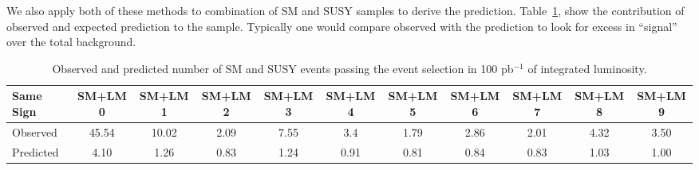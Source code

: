 We also apply both of these methods to combination of SM and SUSY samples to derive the
prediction. Table~\ref{tab:yieldsSUSY}, show the contribution of observed and expected prediction to 
the sample. Typically one would compare observed with the prediction to look for excess 
in ``signal'' over the total background.
\begin{table}[hbt]
\begin{center}
\small\addtolength{\tabcolsep}{-5pt}
\begin{tabular}{|l|c|c|c|c|c|c|c|c|c|c|}\hline
Same Sign  & SM+LM0 & SM+LM1 & SM+LM2 & SM+LM3 & SM+LM4 & SM+LM5 & SM+LM6 & SM+LM7 & SM+LM8 & SM+LM9 \\ \hline
Observed & 45.54 & 10.02 & 2.09 & 7.55 & 3.4 &	1.79 &	2.86 &	2.01 &	4.32 &	3.50 \\ \hline
Predicted & 4.10 & 1.26 & 0.83 & 1.24 &	0.91 &	0.81 &	0.84 &	0.83 &	1.03 &	1.00 \\ \hline
\end{tabular}
\caption{Observed and predicted  number of SM and SUSY events passing the event selection in 100 pb$^{-1}$ of integrated
luminosity.\label{tab:yieldsSUSY}}
\end{center}
\end{table}

\clearpage
